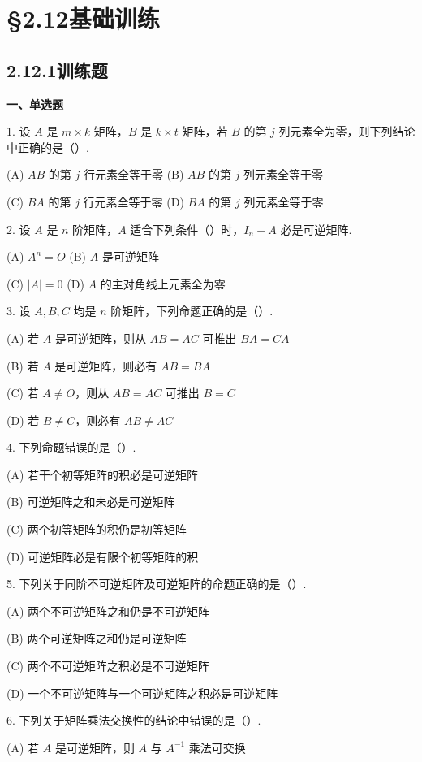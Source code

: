 \documentclass[UTF8,12pt,a4paper,fontset=fandol]{ctexart}
\begin{document}
\section*{§2.12\quad 基础训练}

\subsection*{2.12.1\quad 训练题}

\noindent\textbf{一、单选题}

1. 设 $A$ 是 $m\times k$ 矩阵，$B$ 是 $k\times t$ 矩阵，若 $B$ 的第 $j$ 列元素全为零，则下列结论中正确的是（\quad ）.

(A) $AB$ 的第 $j$ 行元素全等于零\qquad
(B) $AB$ 的第 $j$ 列元素全等于零

(C) $BA$ 的第 $j$ 行元素全等于零\qquad
(D) $BA$ 的第 $j$ 列元素全等于零

2. 设 $A$ 是 $n$ 阶矩阵，$A$ 适合下列条件（\quad ）时，$I_n-A$ 必是可逆矩阵.

(A) $A^n=O$\qquad
(B) $A$ 是可逆矩阵

(C) $|A|=0$\qquad
(D) $A$ 的主对角线上元素全为零

3. 设 $A,B,C$ 均是 $n$ 阶矩阵，下列命题正确的是（\quad ）.

(A) 若 $A$ 是可逆矩阵，则从 $AB=AC$ 可推出 $BA=CA$

(B) 若 $A$ 是可逆矩阵，则必有 $AB=BA$

(C) 若 $A\ne O$，则从 $AB=AC$ 可推出 $B=C$

(D) 若 $B\ne C$，则必有 $AB\ne AC$

4. 下列命题错误的是（\quad ）.

(A) 若干个初等矩阵的积必是可逆矩阵

(B) 可逆矩阵之和未必是可逆矩阵

(C) 两个初等矩阵的积仍是初等矩阵

(D) 可逆矩阵必是有限个初等矩阵的积

5. 下列关于同阶不可逆矩阵及可逆矩阵的命题正确的是（\quad ）.

(A) 两个不可逆矩阵之和仍是不可逆矩阵

(B) 两个可逆矩阵之和仍是可逆矩阵

(C) 两个不可逆矩阵之积必是不可逆矩阵

(D) 一个不可逆矩阵与一个可逆矩阵之积必是可逆矩阵

6. 下列关于矩阵乘法交换性的结论中错误的是（\quad ）.

(A) 若 $A$ 是可逆矩阵，则 $A$ 与 $A^{-1}$ 乘法可交换
\end{document}
